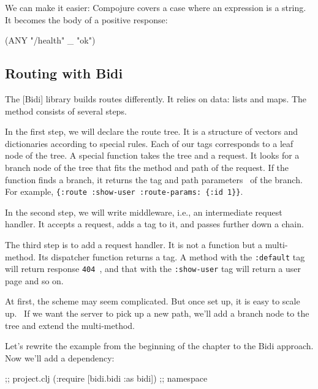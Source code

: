 We can make it easier: Compojure covers a case where an expression is a string. It becomes the body of a positive response:

\begin{english}
\begin{clojure}
(ANY "/health" _ "ok")
\end{clojure}
\end{english}

\subsection{Routing with Bidi}


The [Bidi] library builds routes differently. It relies on data: lists and maps. The method consists of several steps.

In the first step, we will declare the route tree. It is a structure of vectors and dictionaries according to special rules. Each of our tags corresponds to a leaf node of the tree. A special function takes the tree and a request. It looks for a branch node of the tree that fits the method and path of the request. If the function finds a branch, it returns the tag and path parameters  of the branch. For example, \verb|{:route :show-user :route-params: {:id 1}}|.


In the second step, we will write middleware, i.e., an intermediate request handler. It accepts a request, adds a tag to it, and passes further down a chain.

The third step is to add a request handler. It is not a function but a multi-method.
Its dispatcher function returns a tag. A method with the \verb|:default| tag will return response \verb|404 |, and that with the \verb|:show-user| tag will return a user page and so on.

At first, the scheme may seem complicated. But once set up, it is easy to scale up.  If we want the server to pick up a new path, we'll add a branch node to the tree and extend the multi-method.


Let's rewrite the example from the beginning of the chapter to the Bidi approach. Now we'll add a dependency:

\begin{english}
\begin{clojure}
[bidi "2.1.5"]                  ;; project.clj
(:require [bidi.bidi :as bidi]) ;; namespace
\end{clojure}
\end{english}

